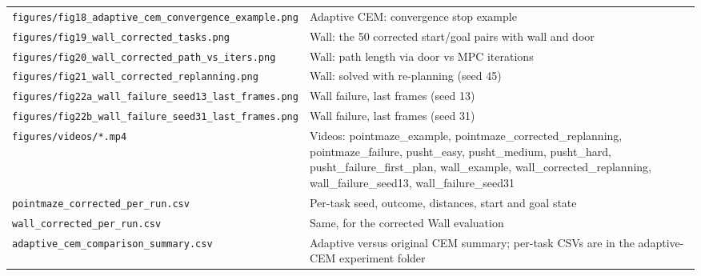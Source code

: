\documentclass[11pt]{article}
\newcommand{\fig}[1]{\texttt{\small figures/#1}}
\begin{document}
\begin{table}[H]
\begin{tabularx}{\linewidth}{lX}
    \fig{fig18\_adaptive\_cem\_convergence\_example.png} & Adaptive CEM: convergence stop example \\
    \fig{fig19\_wall\_corrected\_tasks.png} & Wall: the 50 corrected start/goal pairs with wall and door \\
    \fig{fig20\_wall\_corrected\_path\_vs\_iters.png} & Wall: path length via door vs MPC iterations \\
    \fig{fig21\_wall\_corrected\_replanning.png} & Wall: solved with re-planning (seed 45) \\
    \fig{fig22a\_wall\_failure\_seed13\_last\_frames.png} & Wall failure, last frames (seed 13) \\
    \fig{fig22b\_wall\_failure\_seed31\_last\_frames.png} & Wall failure, last frames (seed 31) \\
    \midrule
    \texttt{\small figures/videos/*.mp4} & \raggedright Videos: pointmaze\_example,
      pointmaze\_corrected\_replanning, pointmaze\_failure, pusht\_easy,
      pusht\_medium, pusht\_hard, pusht\_failure\_first\_plan, wall\_example,
      wall\_corrected\_replanning, wall\_failure\_seed13, wall\_failure\_seed31 \tabularnewline
    \midrule
    \texttt{\small pointmaze\_corrected\_per\_run.csv} & \raggedright Per-task seed, outcome,
      distances, start and goal state \tabularnewline
    \texttt{\small wall\_corrected\_per\_run.csv} & \raggedright Same, for the corrected Wall
      evaluation \tabularnewline
    \texttt{\small adaptive\_cem\_comparison\_summary.csv} & \raggedright Adaptive versus
      original CEM summary; per-task CSVs are in the adaptive-CEM experiment folder \tabularnewline
    \bottomrule
  \end{tabularx}
\end{table}
\end{document}
